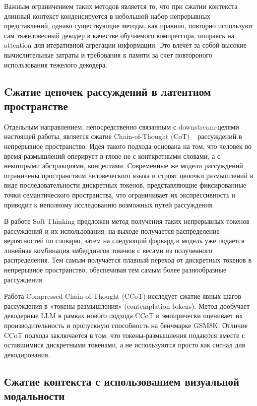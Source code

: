 \documentclass[a4paper,12pt]{extarticle}
\begin{document}
Важным ограничением таких методов является то, что при сжатии контекста длинный контекст конденсируется в небольшой набор непрерывных представлений, однако существующие методы, как правило, повторно используют сам тяжеловесный декодер в качестве обучаемого компрессора, опираясь на attention для итеративной агрегации информации. Это влечёт за собой высокие вычислительные затраты и требования к памяти за счет повтороного использования тежелого декодера.

\subsection{Cжатие цепочек рассуждений в латентном пространстве}

Отдельным направлением, непосредственно связанным с downstream-целями настоящей работы, является сжатие Chain-of-Thought (CoT) ~\cite{cot} рассуждений в непрерывное пространство. Идея такого подхода основана на том, что человек во время размышлений оперирует в глове не с конткретными словами, а с некоторыми абстракциями, концептами. Cовременные же модели рассуждений ограничены пространством человеческого языка и строят цепочки размышлений в виде последовательности дискретных токенов, представляющие фиксированные точки семантического пространства, что ограничивает их экспрессивность и приводит к неполному исследованию возможных путей рассуждения. ~\cite{soft_thinking}

В работе Soft Thinking предложен метод получения таких непрерывных токенов рассуждений и их использования: на выходе получается распределение вероятностей по словарю, затем на следующий форвард в модель уже подается линейная комбинация эмбеддингов токенов с весами из полученного распределения. Тем самым получается плавный переход от дискретных токенов в непрерывное пространство, обеспечивая тем самым более разнообразные рассуждения. ~\cite{soft_thinking}

Работа Compressed Chain-of-Thought (CCoT) исследует сжатие явных шагов рассуждения в «токены-размышления» (contemplation tokens). Метод дообучает декодерные LLM в рамках нового подхода CCoT и эмпирически оценивает их производительность и пропускную способность на бенчмарке GSM8K. Отличие CCoT подхода заключается в том, что токены-размышления подаются вместе с оставшимися дискретными токенами, а не используются просто как сигнал для декодирования. ~\cite{ccot}

\subsection{Сжатие контекста с использованием визуальной модальности}
\end{document}
